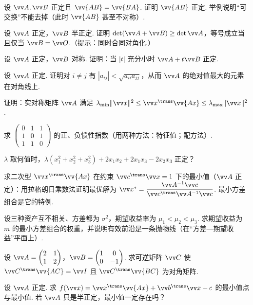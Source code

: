 {		\Bgroup
		\begin{exB}
			\item\label{ex:quad:B1} 设 $\vv A,\vv B$ 正定且 $\vv{AB}=\vv{BA}$. 证明 $\vv{AB}$ 正定. 举例说明“可交换”不能去掉（此时 $\vv{AB}$ 甚至不对称）.
			\item\label{ex:quad:B2} 设 $\vv A$ 正定，$\vv B$ 半正定. 证明 $\det(\vv A+\vv B)\ge\det\vv A$，等号成立当且仅当 $\vv B=\vv O$.（提示：同时合同对角化.）
			\item\label{ex:quad:B3} 设 $\vv A$ 正定，$\vv B$ 对称. 证明：当 $|t|$ 充分小时 $\vv A+t\vv B$ 正定.
			\item\label{ex:quad:B4} 设 $\vv A$ 正定. 证明对 $i\ne j$ 有 $|a_{ij}|<\sqrt{a_{ii}a_{jj}}$，从而 $\vv A$ 的绝对值最大的元素在对角线上.
			\item\label{ex:quad:B5} 证明：实对称矩阵 $\vv A$ 满足 $\lambda_{\min}\|\vv x\|^2\le\vv x^\trans\vv{Ax}\le\lambda_{\max}\|\vv x\|^2$.
			\item\label{ex:quad:B6} 求 $\begin{pmatrix}0&1&1\\1&0&1\\1&1&0\end{pmatrix}$ 的正、负惯性指数（用两种方法：特征值；配方法）.
			\item\label{ex:quad:B7} $\lambda$ 取何值时，$\lambda(x_1^2+x_2^2+x_3^2)+2x_1x_2+2x_1x_3-2x_2x_3$ 正定？
			\item\label{ex:quad:B8} 求二次型 $\vv x^\trans\vv{Ax}$ 在约束 $\vv c^\trans\vv x=1$ 下的最小值（$\vv A$ 正定）：用拉格朗日乘数法证明最优解为 $\vv x^*=\dfrac{\vv A^{-1}\vv c}{\vv c^\trans\vv A^{-1}\vv c}$. 最小方差组合是它的特例.
			\item\label{ex:quad:B9} 设三种资产互不相关、方差都为 $\sigma^2$，期望收益率为 $\mu_1<\mu_2<\mu_3$. 求期望收益为 $m$ 的最小方差组合的权重，并说明有效前沿是一条抛物线（在“方差—期望收益”平面上）.
			\item\label{ex:quad:B10} 设 $\vv A=\begin{pmatrix}2&1\\1&2\end{pmatrix}$，$\vv B=\begin{pmatrix}1&0\\0&-1\end{pmatrix}$. 求可逆矩阵 $\vv C$ 使 $\vv C^\trans\vv{AC}=\vv I$ 且 $\vv C^\trans\vv{BC}$ 为对角矩阵.
			\item\label{ex:quad:B11} 设 $\vv A$ 正定. 求 $f(\vv x)=\vv x^\trans\vv{Ax}+\vv b^\trans\vv x+c$ 的最小值点与最小值. 若 $\vv A$ 只是半正定，最小值一定存在吗？

\end{exB}}
